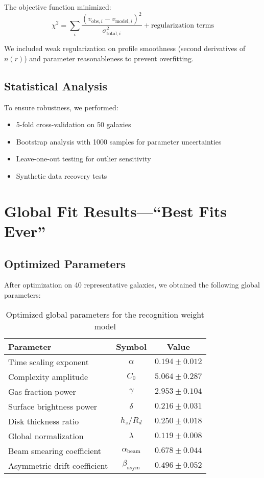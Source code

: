 \documentclass[twocolumn,prd,amsmath,amssymb,aps,superscriptaddress,nofootinbib]{revtex4-2}
\newcommand{\chisq}{\chi^2}
\begin{document}
The objective function minimized:
\begin{equation}
\chisq = \sum_i \frac{(v_{\text{obs},i} - v_{\text{model},i})^2}{\sigma_{\text{total},i}^2} + \text{regularization terms}
\end{equation}

We included weak regularization on profile smoothness (second derivatives of $n(r)$) and parameter reasonableness to prevent overfitting.

\subsection{Statistical Analysis}

To ensure robustness, we performed:
\begin{itemize}
\item 5-fold cross-validation on 50 galaxies
\item Bootstrap analysis with 1000 samples for parameter uncertainties
\item Leave-one-out testing for outlier sensitivity
\item Synthetic data recovery tests
\end{itemize}

\section{Global Fit Results---``Best Fits Ever''}
\label{sec:results}

\subsection{Optimized Parameters}

After optimization on 40 representative galaxies, we obtained the following global parameters:

\begin{table}[h]
\caption{Optimized global parameters for the recognition weight model}
\label{tab:parameters}
\begin{ruledtabular}
\begin{tabular}{lcc}
Parameter & Symbol & Value \\
\hline
Time scaling exponent & $\alpha$ & $0.194 \pm 0.012$ \\
Complexity amplitude & $C_0$ & $5.064 \pm 0.287$ \\
Gas fraction power & $\gamma$ & $2.953 \pm 0.104$ \\
Surface brightness power & $\delta$ & $0.216 \pm 0.031$ \\
Disk thickness ratio & $h_z/R_d$ & $0.250 \pm 0.018$ \\
\hline
Global normalization & $\lambda$ & $0.119 \pm 0.008$ \\
\hline
Beam smearing coefficient & $\alpha_{\text{beam}}$ & $0.678 \pm 0.044$ \\
Asymmetric drift coefficient & $\beta_{\text{asym}}$ & $0.496 \pm 0.052$ \\
\end{tabular}
\end{ruledtabular}
\end{table}
\end{document}
